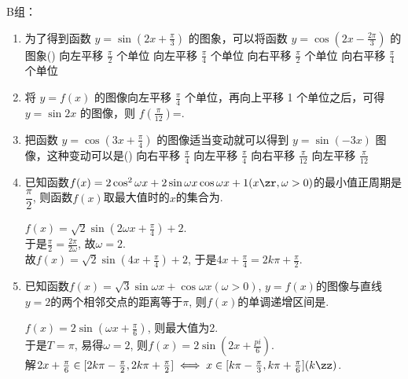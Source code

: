 B组：
\begin{enumerate}

\item 为了得到函数 $y=\sin \left(2 x+\frac{\pi}{3}\right)$ 的图象，可以将函数 $y=\cos \left(2 x-\frac{2 \pi}{3}\right)$ 的图象\dotfill()
\xx
{向左平移 $\frac{\pi}{2}$ 个单位}
{向左平移 $\frac{\pi}{4}$ 个单位}
{向右平移 $\frac{\pi}{2}$ 个单位}
{向右平移 $\frac{\pi}{4}$ 个单位}


\item 将 $y=f(x)$ 的图像向左平移 $\frac{\pi}{4}$ 个单位，再向上平移 1 个单位之后，可得 $y=\sin 2 x$ 的图像，则 $f\left(\frac{\pi}{12}\right)$=.


\item 把函数 $y=\cos \left(3 x+\frac{\pi}{4}\right)$ 的图像适当变动就可以得到 $y=\sin (-3 x)$ 图像，这种变动可以是\dotfill()
\xx
{向右平移 $\frac{\pi}{4}$}
{向左平移 $\frac{\pi}{4}$}
{向右平移 $\frac{\pi}{12}$}
{向左平移 $\frac{\pi}{12}$}


\item 已知函数$f(x)=2\cos^2\omega{x}+2\sin\omega{x}\cos\omega{x}+1(x\zr,\omega>0)$的最小值正周期是$\dfrac{\pi}{2}$, 
则函数$f(x)$取最大值时的$x$的集合为. 
\begin{jieda}
$f(x)=\sqrt{2}\sin(2\omega{x}+\frac{\pi}{4})+2$. \\
于是$\frac{\pi}{2}=\frac{2\pi}{2\omega}$, 故$\omega=2$. \\
故$f(x)=\sqrt{2}\sin(4x+\frac{\pi}{4})+2$, 于是$4x+\frac{\pi}{4}=2k\pi+\frac{\pi}{2}$. 
\end{jieda}

\item 已知函数$f(x)=\sqrt{3}\sin\omega{x}+\cos\omega{x}(\omega>0)$, $y=f(x)$的图像与直线$y=2$的两个相邻交点的距离等于$\pi$, 
则$f(x)$的单调递增区间是. 
\begin{jieda}
$f(x)=2\sin(\omega{x}+\frac{\pi}{6})$, 则最大值为2. \\
于是$T=\pi$, 易得$\omega=2$, 则$f(x)=2\sin(2x+\frac{pi}{6})$. \\
解$2x+\frac{\pi}{6}\in[2k\pi-\frac{\pi}{2},2k\pi+\frac{\pi}{2}]\iff x\in[k\pi-\frac{\pi}{3},k\pi+\frac{\pi}{6}](k\zz)$. 
\end{jieda}


\end{enumerate}
